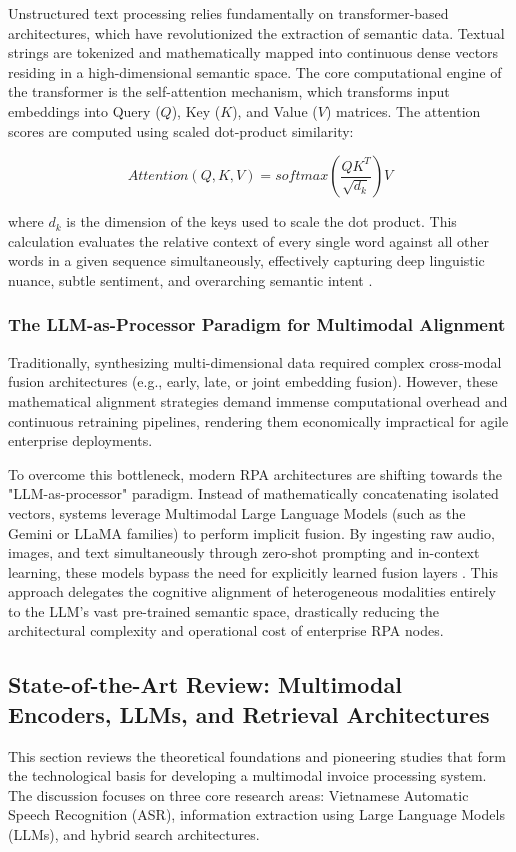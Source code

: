 Unstructured text processing relies fundamentally on transformer-based architectures, which have revolutionized the extraction of semantic data. Textual strings are tokenized and mathematically mapped into continuous dense vectors residing in a high-dimensional semantic space. The core computational engine of the transformer is the self-attention mechanism, which transforms input embeddings into Query ($Q$), Key ($K$), and Value ($V$) matrices. The attention scores are computed using scaled dot-product similarity:

\begin{equation*}
    Attention(Q, K, V) = softmax \left( \frac{QK^T}{\sqrt{d_k}} \right) V
\end{equation*}

where $d_k$ is the dimension of the keys used to scale the dot product. This calculation evaluates the relative context of every single word against all other words in a given sequence simultaneously, effectively capturing deep linguistic nuance, subtle sentiment, and overarching semantic intent \parencite{dubey2024llama}.

\subsubsection{The LLM-as-Processor Paradigm for Multimodal Alignment}
Traditionally, synthesizing multi-dimensional data required complex cross-modal fusion architectures (e.g., early, late, or joint embedding fusion). However, these mathematical alignment strategies demand immense computational overhead and continuous retraining pipelines, rendering them economically impractical for agile enterprise deployments. 

To overcome this bottleneck, modern RPA architectures are shifting towards the "LLM-as-processor" paradigm. Instead of mathematically concatenating isolated vectors, systems leverage Multimodal Large Language Models (such as the Gemini or LLaMA families) to perform implicit fusion. By ingesting raw audio, images, and text simultaneously through zero-shot prompting and in-context learning, these models bypass the need for explicitly learned fusion layers \parencite{dubey2024llama}. This approach delegates the cognitive alignment of heterogeneous modalities entirely to the LLM's vast pre-trained semantic space, drastically reducing the architectural complexity and operational cost of enterprise RPA nodes.

\subsection{State-of-the-Art Review: Multimodal Encoders, LLMs, and Retrieval Architectures}
This section reviews the theoretical foundations and pioneering studies that form the technological basis for developing a multimodal invoice processing system. The discussion focuses on three core research areas: Vietnamese Automatic Speech Recognition (ASR), information extraction using Large Language Models (LLMs), and hybrid search architectures.

